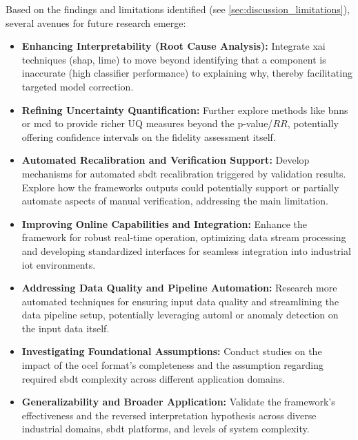 Based on the findings and limitations identified (see \autoref{sec:discussion_limitations}), several avenues for future research emerge:

\begin{itemize}
  \item \textbf{Enhancing Interpretability (Root Cause Analysis):} Integrate \gls{xai} techniques (\gls{shap}, \gls{lime}) to move beyond identifying that a component is inaccurate (high classifier performance) to explaining why, thereby facilitating targeted model correction.
  \item \textbf{Refining Uncertainty Quantification:} Further explore methods like \gls{bnn}s or \gls{mcd} to provide richer UQ measures beyond the p-value/$RR$, potentially offering confidence intervals on the fidelity assessment itself.
  \item \textbf{Automated Recalibration and Verification Support:} Develop mechanisms for automated \gls{sbdt} recalibration triggered by validation results. Explore how the frameworks outputs could potentially support or partially automate aspects of manual verification, addressing the main limitation.
  \item \textbf{Improving Online Capabilities and Integration:} Enhance the framework for robust real-time operation, optimizing data stream processing and developing standardized interfaces for seamless integration into industrial \gls{iot} environments.
  \item \textbf{Addressing Data Quality and Pipeline Automation:} Research more automated techniques for ensuring input data quality and streamlining the data pipeline setup, potentially leveraging \gls{automl} or anomaly detection on the input data itself.
  \item \textbf{Investigating Foundational Assumptions:} Conduct studies on the impact of the \gls{ocel} format's completeness and the assumption regarding required \gls{sbdt} complexity across different application domains.
  \item \textbf{Generalizability and Broader Application:} Validate the framework's effectiveness and the reversed interpretation hypothesis across diverse industrial domains, \gls{sbdt} platforms, and levels of system complexity.

\end{itemize}

